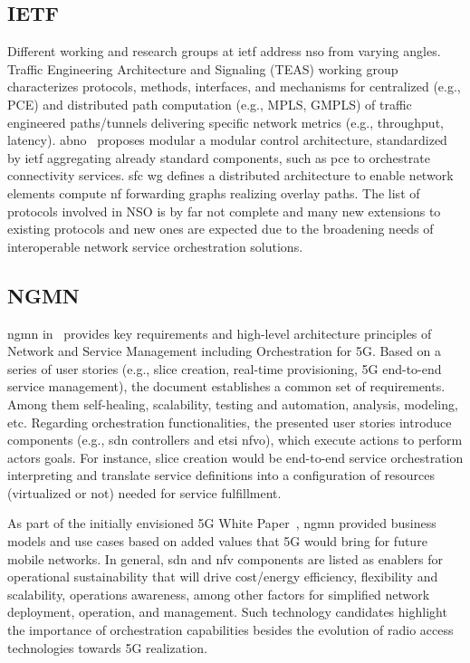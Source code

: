\subsection{IETF}
Different working and research groups at \gls{ietf} address \gls{nso} from varying angles. Traffic Engineering Architecture and Signaling (TEAS) working group characterizes protocols, methods, interfaces, and mechanisms for centralized (e.g., PCE) and distributed path computation (e.g., MPLS, GMPLS) of traffic engineered paths/tunnels delivering specific network metrics (e.g., throughput, latency).  
\gls{abno}~\cite{RFC7491} proposes modular a modular control architecture, standardized by \gls{ietf} aggregating already standard components, such as \gls{pce} to orchestrate connectivity services.  
\gls{sfc} \gls{wg} defines a distributed architecture to enable network elements compute \gls{nf} forwarding graphs realizing overlay paths.
The list of protocols involved in NSO is by far not complete and many new extensions to existing protocols and new ones are expected due to the broadening needs of interoperable network service orchestration solutions.

\subsection{NGMN}
\gls{ngmn} in~\cite{NGMN:5G:2017} provides key requirements and high-level architecture principles of Network and Service Management including Orchestration for 5G. Based on a series of user stories (e.g., slice creation, real-time provisioning, 5G end-to-end service management), the document establishes a common set of requirements. Among them self-healing, scalability, testing and automation, analysis, modeling, etc. Regarding orchestration functionalities, the presented user stories introduce components (e.g., \gls{sdn} controllers and \gls{etsi} \gls{nfvo}), which execute actions to perform actors goals. For instance, slice creation would be end-to-end service orchestration interpreting and translate service definitions into a configuration of resources (virtualized or not) needed for service fulfillment.  

As part of the initially envisioned 5G White Paper~\cite{NGMNAlliance20155GPaper}, \gls{ngmn} provided business models and use cases based on added values that 5G would bring for future mobile networks. In general, \gls{sdn} and \gls{nfv} components are listed as enablers for operational sustainability that will drive cost/energy efficiency, flexibility and scalability, operations awareness, among other factors for simplified network deployment, operation, and management. Such technology candidates highlight the importance of orchestration capabilities besides the evolution of radio access technologies towards 5G realization.

